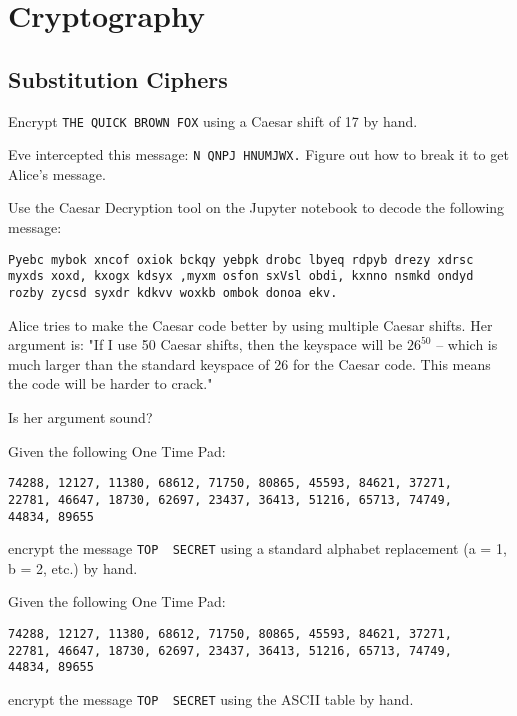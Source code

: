 \documentclass[11pt,a4paper]{report}
\begin{document}
\section{Cryptography}

\subsection{Substitution Ciphers}

\begin{ex}
Encrypt \verb|THE QUICK BROWN FOX| using a Caesar shift of 17 by hand.
\end{ex}


\begin{ex}
Eve intercepted this message: \verb|N QNPJ HNUMJWX.| Figure out how to break it to get Alice’s message.
\end{ex}


\begin{ex}
Use the Caesar Decryption tool on the Jupyter notebook to decode the following message:
\begin{verbatim}
Pyebc mybok xncof oxiok bckqy yebpk drobc lbyeq rdpyb drezy xdrsc
myxds xoxd, kxogx kdsyx ,myxm osfon sxVsl obdi, kxnno nsmkd ondyd
rozby zycsd syxdr kdkvv woxkb ombok donoa ekv.
\end{verbatim}
\end{ex}

\begin{ex}
Alice tries to make the Caesar code better by using multiple Caesar shifts. Her argument is: "If I use 50 Caesar shifts,  then the keyspace will be $26^{50}$ -- which is much larger than the standard keyspace of 26 for the Caesar code.  This means the code will be harder to crack." 

Is her argument sound?
\end{ex}

\begin{ex}
Given the following One Time Pad: 
\begin{verbatim}
74288, 12127, 11380, 68612, 71750, 80865, 45593, 84621, 37271,
22781, 46647, 18730, 62697, 23437, 36413, 51216, 65713, 74749,
44834, 89655
\end{verbatim}
encrypt the message \verb|TOP  SECRET| using a standard alphabet replacement (a = 1, b = 2, etc.) by hand.
\end{ex}

\begin{ex}
Given the following One Time Pad: 
\begin{verbatim}
74288, 12127, 11380, 68612, 71750, 80865, 45593, 84621, 37271,
22781, 46647, 18730, 62697, 23437, 36413, 51216, 65713, 74749,
44834, 89655
\end{verbatim}
encrypt the message \verb|TOP  SECRET| using the ASCII table by hand.
\end{ex}
\end{document}
